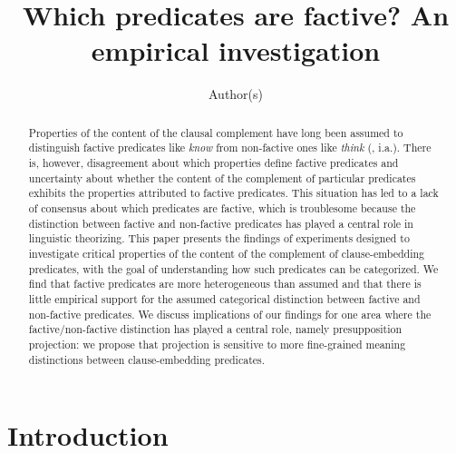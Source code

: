 \documentclass[11pt,fleqn]{article}
\title{Which predicates are factive? An empirical investigation}
\author{Author(s)}
\newcommand{\6}{\mbox{$[\hspace*{-.6mm}[$}}
\newcommand{\9}{\mbox{$]\hspace*{-.6mm}]$}}
\begin{document}

\maketitle


\begin{abstract}

Properties of the content of the clausal complement have long been assumed to distinguish factive predicates like {\em know} from non-factive ones like {\em think} (\citealt{kiparsky-kiparsky70}, i.a.). There is, however, disagreement  about which properties define factive predicates and uncertainty about whether the content of the complement of particular predicates exhibits the properties attributed to factive predicates. This situation has led to a lack of consensus about which predicates are factive, which is troublesome because the distinction between factive and non-factive predicates has played a central role in linguistic theorizing. This paper presents the findings of experiments designed to investigate critical properties of the content of the complement of clause-embedding predicates, with the goal of understanding how such predicates can be categorized. We find that factive predicates are more heterogeneous than assumed and that there is little empirical support for the assumed categorical distinction between factive and non-factive predicates. We discuss implications of our findings for one area where the factive/non-factive distinction has played a central role, namely presupposition projection: we propose that projection is sensitive to more fine-grained meaning distinctions between clause-embedding predicates.

\end{abstract}

			
\section{Introduction}\label{s1}
\end{document}
